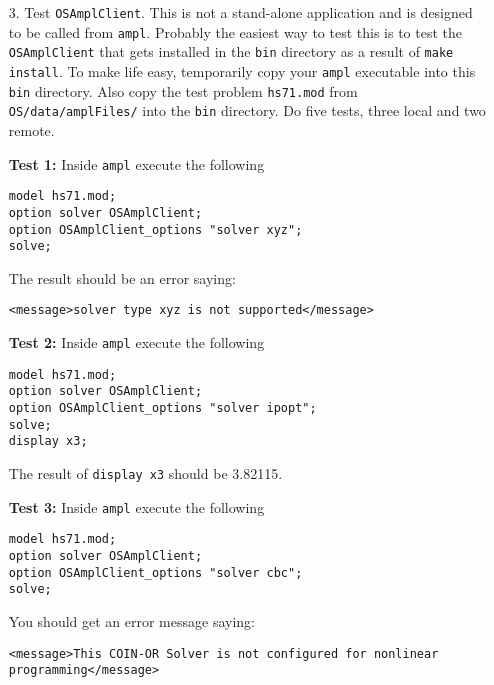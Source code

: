 \begin{itemize}
\begin{itemize}
\end{itemize}



{\bf IMPORTANT:}  Please do NOT commit the changes to these config files. 

 
 
 \item[3.]  Test {\tt OSAmplClient}.  This is not a stand-alone application and is designed to be called from  {\tt ampl}.   Probably the easiest way to test this is to test the {\tt OSAmplClient}  that gets installed in the {\tt bin} directory as a result of {\tt make install}. To make life easy, temporarily copy your {\tt ampl} executable into this {\tt bin} directory.   Also copy the test problem {\tt hs71.mod}  from {\tt OS/data/amplFiles/} into the {\tt bin} directory.   Do five tests, three local and two remote.
 
 
 \vskip 10pt
 
 
 {\bf Test 1:}  Inside  {\tt ampl} execute the following
 


\begin{verbatim}
model hs71.mod;
option solver OSAmplClient;
option OSAmplClient_options "solver xyz";
solve;
\end{verbatim}

The result should be an error saying:
\begin{verbatim}
<message>solver type xyz is not supported</message>
\end{verbatim}
 
 \vskip 10pt
 
 {\bf Test 2:}  Inside  {\tt ampl} execute the following
 
\begin{verbatim}
model hs71.mod;
option solver OSAmplClient;
option OSAmplClient_options "solver ipopt";
solve;
display x3;
\end{verbatim}

The result of {\tt display x3} should be 3.82115. 


 \vskip 10pt
 
 {\bf Test 3:}  Inside  {\tt ampl} execute the following
 
\begin{verbatim}
model hs71.mod;
option solver OSAmplClient;
option OSAmplClient_options "solver cbc";
solve;
\end{verbatim}

You should get an error message saying:
\begin{verbatim}
<message>This COIN-OR Solver is not configured for nonlinear programming</message>
\end{verbatim}



\end{itemize}
